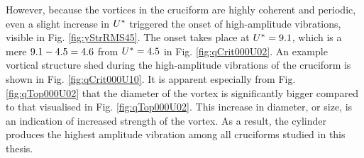\documentclass[oneside]{utmthesis}
\begin{document}
\noindent However, because the vortices in the \angon{} cruciform are highly coherent and periodic, even a slight increase in $U^{*}$ triggered the onset of high-amplitude vibrations, visible in Fig. \ref{fig:yStrRMS45}. The onset takes place at $U^{*} = 9.1$, which is a mere $9.1 - 4.5 = 4.6$ from $U^{*} = 4.5$ in Fig. \ref{fig:qCrit000U02}. An example vortical structure shed during the high-amplitude vibrations of the \angon{} cruciform is shown in Fig. \ref{fig:qCrit000U10}. It is apparent especially from Fig. \ref{fig:qTop000U02} that the diameter of the vortex is significantly bigger compared to that visualised in Fig. \ref{fig:qTop000U02}. This increase in diameter, or size, is an indication of increased strength of the vortex. As a result, the cylinder produces the highest amplitude vibration among all cruciforms studied in this thesis.
\end{document}

